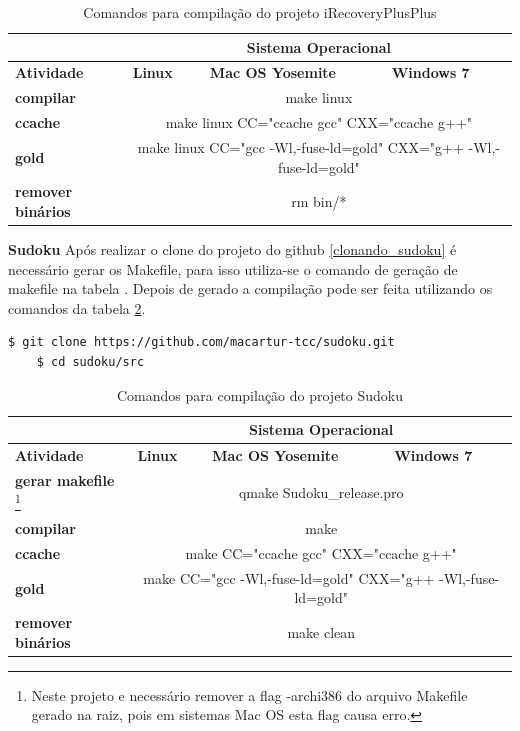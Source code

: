 \begin{itemize}
\begin{table}[h]
\begin{tabular}{p{2cm}p{2cm}p{2cm}p{2cm}}
\toprule
 & \multicolumn{3}{c}{Sistema Operacional} \\ \toprule 
\textbf{Atividade} & \textbf{Linux} & \textbf{Mac OS Yosemite} & \textbf{Windows 7}  \\ \midrule 
\textbf{compilar} & \multicolumn{3}{c}{make linux} \\ \midrule
\textbf{ccache} & \multicolumn{3}{c}{make linux CC="ccache gcc" CXX="ccache g++"} \\ \midrule
\textbf{gold} & \multicolumn{3}{c}{make linux  CC="gcc -Wl,-fuse-ld=gold" CXX="g++ -Wl,-fuse-ld=gold"} \\ \midrule
\textbf{remover binários} & \multicolumn{3}{c}{rm bin/*} \\ \bottomrule
\end{tabular} 
\caption{Comandos para compilação do projeto iRecoveryPlusPlus}
\label{t_compilacao_irecoveryplusplus}
\end{table}

    \subitem \textbf{Sudoku}
    \subitem Após realizar o clone do projeto do github
 \ref{clonando_sudoku} é necessário  gerar os Makefile,
 para isso utiliza-se o comando de geração de makefile na tabela .
Depois de gerado a compilação pode ser feita utilizando
 os comandos da tabela \ref{t_compilacao_sudoku}.

    
\begin{lstlisting}[language=bash, caption={Clonado Projeto iRecoveryplusplus},
                  label=clonando_sudoku]
    $ git clone https://github.com/macartur-tcc/sudoku.git 
    $ cd sudoku/src
\end{lstlisting}


\begin{table}[h]
\begin{tabular}{p{2cm}p{2cm}p{2cm}p{2cm}}
\toprule
 & \multicolumn{3}{c}{Sistema Operacional} \\ \toprule 
\textbf{Atividade} & \textbf{Linux} & \textbf{Mac OS Yosemite} & \textbf{Windows 7}  \\ \midrule 
\textbf{gerar makefile}
\footnote{Neste projeto e necessário remover a flag -archi386 do arquivo Makefile gerado na raiz, pois em sistemas Mac OS esta flag causa erro.}
 & \multicolumn{3}{c}{qmake Sudoku\_release.pro} \\ \midrule
\textbf{compilar} & \multicolumn{3}{c}{make } \\ \midrule
\textbf{ccache} & \multicolumn{3}{c}{make CC="ccache gcc" CXX="ccache g++"} \\ \midrule
\textbf{gold} & \multicolumn{3}{c}{make  CC="gcc -Wl,-fuse-ld=gold" CXX="g++ -Wl,-fuse-ld=gold"} \\ \midrule
\textbf{remover binários} & \multicolumn{3}{c}{make clean} \\ \bottomrule
\end{tabular} 
\caption{Comandos para compilação do projeto Sudoku}
\label{t_compilacao_sudoku}
\end{table}


\end{itemize}
